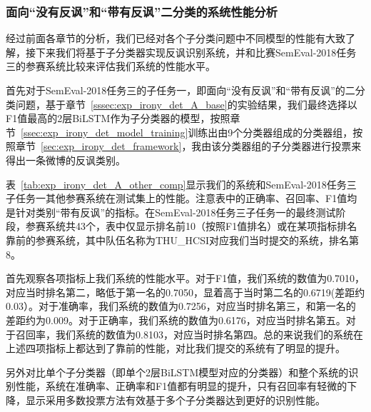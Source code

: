 \subsubsection{面向“没有反讽”和“带有反讽”二分类的系统性能分析}

经过前面各章节的分析，我们已经对各个子分类问题中不同模型的性能有大致了解，接下来我们将基于子分类器实现反讽识别系统，并和比赛SemEval-2018任务三的参赛系统比较来评估我们系统的性能水平。

首先对于SemEval-2018任务三的子任务一，即面向“没有反讽”和“带有反讽”的二分类问题，基于章节~\ref{sssec:exp_irony_det_A_base}的实验结果，我们最终选择以F1值最高的2层BiLSTM作为子分类器的模型，按照章节~\ref{ssec:exp_irony_det_model_training}训练出由9个分类器组成的分类器组，按照章节~\ref{sec:exp_irony_det_framework}，我由该分类器组的子分类器进行投票来得出一条微博的反讽类别。

表~\ref{tab:exp_irony_det_A_other_comp}显示我们的系统和SemEval-2018任务三子任务一其他参赛系统在测试集上的性能。注意表中的正确率、召回率、F1值均是针对类别“带有反讽”的指标。在SemEval-2018任务三子任务一的最终测试阶段，参赛系统共43个，表中仅显示排名前10（按照F1值排名）或在某项指标排名靠前的参赛系统，其中队伍名称为THU\_HCSI对应我们当时提交的系统，排名第8。

首先观察各项指标上我们系统的性能水平。对于F1值，我们系统的数值为0.7010，对应当时排名第二，略低于第一名的0.7050，显着高于当时第二名的0.6719(差距约0.03）。对于准确率，我们系统的数值为0.7256，对应当时排名第三，和第一名的差距约为0.009。对于正确率，我们系统的数值为0.6176，对应当时排名第五。对于召回率，我们系统的数值为0.8103，对应当时排名第四。总的来说我们的系统在上述四项指标上都达到了靠前的性能，对比我们提交的系统有了明显的提升。

另外对比单个子分类器（即单个2层BiLSTM模型对应的分类器）和整个系统的识别性能，系统在准确率、正确率和F1值都有明显的提升，只有召回率有轻微的下降，显示采用多数投票方法有效基于多个子分类器达到更好的识别性能。

